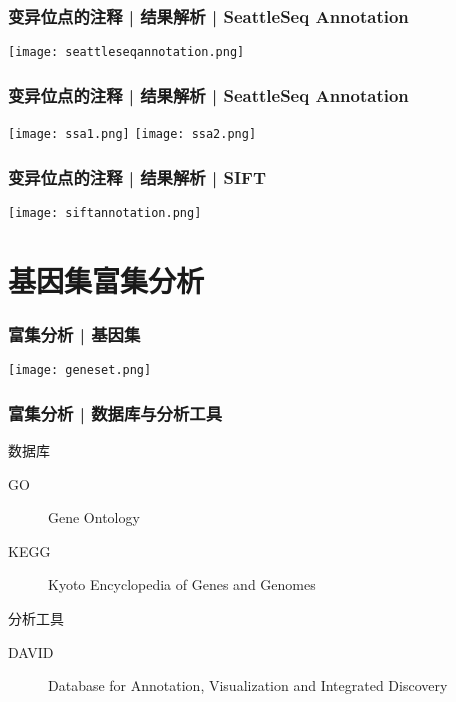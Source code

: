 \begin{frame}
  \frametitle{变异位点的注释 | \alert{结果解析} | SeattleSeq Annotation}
    \begin{center}
      \texttt{[image: seattleseqannotation.png]}
    \end{center}
\end{frame}

\begin{frame}
  \frametitle{变异位点的注释 | \alert{结果解析} | SeattleSeq Annotation}
    \begin{center}
      \texttt{[image: ssa1.png]}
      \vspace{0.5cm}
      \texttt{[image: ssa2.png]}
    \end{center}
\end{frame}

\begin{frame}
  \frametitle{变异位点的注释 | \alert{结果解析} | SIFT}
    \begin{center}
      \texttt{[image: siftannotation.png]}
    \end{center}
\end{frame}

\section{基因集富集分析}
\begin{frame}
  \frametitle{富集分析 | 基因集}
    \begin{center}
      \texttt{[image: geneset.png]}
    \end{center}
\end{frame}

\begin{frame}
  \frametitle{富集分析 | 数据库与分析工具}
  \begin{block}{数据库}
  \begin{description}
    \item[GO] Gene Ontology
    \item[KEGG] Kyoto Encyclopedia of Genes and Genomes
  \end{description}
  \end{block}
  \pause
  \begin{block}{分析工具}
  \begin{description}
    \item[DAVID] Database for Annotation, Visualization and Integrated Discovery
  \end{description}
  \end{block}
\end{frame}

